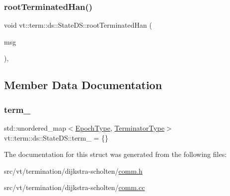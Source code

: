 \subsubsection{\texorpdfstring{root\+Terminated\+Han()}{rootTerminatedHan()}}
{\footnotesize\ttfamily void vt\+::term\+::ds\+::\+State\+D\+S\+::root\+Terminated\+Han (\begin{DoxyParamCaption}\item[{\hyperlink{structvt_1_1term_1_1ds_1_1_ack_msg}{Ack\+Msg} $\ast$}]{msg }\end{DoxyParamCaption})\hspace{0.3cm}{\ttfamily [static]}, {\ttfamily [private]}}



\subsection{Member Data Documentation}
\mbox{\label{structvt_1_1term_1_1ds_1_1_state_d_s_a97a12b9645ebe99171d7680baab34b5d}} 
\subsubsection{\texorpdfstring{term\+\_\+}{term\_}}
{\footnotesize\ttfamily std\+::unordered\+\_\+map$<$\hyperlink{namespacevt_a985a5adf291c34a3ca263b3378388236}{Epoch\+Type}, \hyperlink{structvt_1_1term_1_1ds_1_1_state_d_s_af98cfe31c25f710273ee103026d538e4}{Terminator\+Type}$>$ vt\+::term\+::ds\+::\+State\+D\+S\+::term\+\_\+ = \{\}\hspace{0.3cm}{\ttfamily [protected]}}



The documentation for this struct was generated from the following files\+:\begin{DoxyCompactItemize}
\item 
src/vt/termination/dijkstra-\/scholten/\hyperlink{comm_8h}{comm.\+h}\item 
src/vt/termination/dijkstra-\/scholten/\hyperlink{comm_8cc}{comm.\+cc}\end{DoxyCompactItemize}
